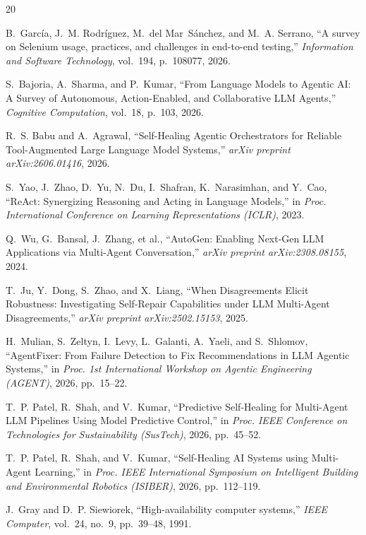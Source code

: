 \documentclass[conference]{IEEEtran}
\begin{document}
\begin{thebibliography}{20}

B.~Garc{\'i}a, J.~M. Rodr{\'i}guez, M.~del Mar~S{\'a}nchez, and M.~A. Serrano,
``A survey on Selenium usage, practices, and challenges in end-to-end testing,''
\textit{Information and Software Technology}, vol.~194, p.~108077, 2026.

S.~Bajoria, A.~Sharma, and P.~Kumar,
``From Language Models to Agentic AI: A Survey of Autonomous, Action-Enabled, and Collaborative LLM Agents,''
\textit{Cognitive Computation}, vol.~18, p.~103, 2026.

R.~S. Babu and A.~Agrawal,
``Self-Healing Agentic Orchestrators for Reliable Tool-Augmented Large Language Model Systems,''
\textit{arXiv preprint arXiv:2606.01416}, 2026.

S.~Yao, J.~Zhao, D.~Yu, N.~Du, I.~Shafran, K.~Narasimhan, and Y.~Cao,
``ReAct: Synergizing Reasoning and Acting in Language Models,''
in \textit{Proc. International Conference on Learning Representations (ICLR)}, 2023.

Q.~Wu, G.~Bansal, J.~Zhang, et al.,
``AutoGen: Enabling Next-Gen LLM Applications via Multi-Agent Conversation,''
\textit{arXiv preprint arXiv:2308.08155}, 2024.

T.~Ju, Y.~Dong, S.~Zhao, and X.~Liang,
``When Disagreements Elicit Robustness: Investigating Self-Repair Capabilities under LLM Multi-Agent Disagreements,''
\textit{arXiv preprint arXiv:2502.15153}, 2025.

H.~Mulian, S.~Zeltyn, I.~Levy, L.~Galanti, A.~Yaeli, and S.~Shlomov,
``AgentFixer: From Failure Detection to Fix Recommendations in LLM Agentic Systems,''
in \textit{Proc. 1st International Workshop on Agentic Engineering (AGENT)}, 2026, pp.~15--22.

T.~P. Patel, R.~Shah, and V.~Kumar,
``Predictive Self-Healing for Multi-Agent LLM Pipelines Using Model Predictive Control,''
in \textit{Proc. IEEE Conference on Technologies for Sustainability (SusTech)}, 2026, pp.~45--52.

T.~P. Patel, R.~Shah, and V.~Kumar,
``Self-Healing AI Systems using Multi-Agent Learning,''
in \textit{Proc. IEEE International Symposium on Intelligent Building and Environmental Robotics (ISIBER)}, 2026, pp.~112--119.

J.~Gray and D.~P. Siewiorek,
``High-availability computer systems,''
\textit{IEEE Computer}, vol.~24, no.~9, pp.~39--48, 1991.


\end{thebibliography}
\end{document}
